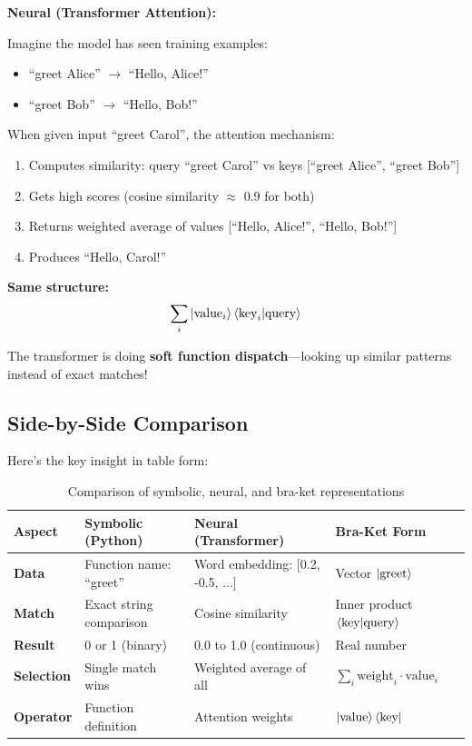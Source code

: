 \documentclass[11pt,a4paper]{article}
\theoremstyle{definition}
\begin{document}
\textbf{Neural (Transformer Attention):}

Imagine the model has seen training examples:
\begin{itemize}
\item ``greet Alice'' $\to$ ``Hello, Alice!''
\item ``greet Bob'' $\to$ ``Hello, Bob!''
\end{itemize}

When given input ``greet Carol'', the attention mechanism:
\begin{enumerate}
\item Computes similarity: query ``greet Carol'' vs keys [``greet Alice'', ``greet Bob'']
\item Gets high scores (cosine similarity $\approx$ 0.9 for both)
\item Returns weighted average of values [``Hello, Alice!'', ``Hello, Bob!'']
\item Produces ``Hello, Carol!''
\end{enumerate}

\textbf{Same structure:} 
\begin{equation}
\sum_i \ket{\text{value}_i} \braket{\text{key}_i|\text{query}}
\end{equation}

The transformer is doing \textbf{soft function dispatch}---looking up similar patterns instead of exact matches!

\subsection{Side-by-Side Comparison}

Here's the key insight in table form:

\begin{table}[h]
\centering
\begin{tabular}{llll}
\toprule
\textbf{Aspect} & \textbf{Symbolic (Python)} & \textbf{Neural (Transformer)} & \textbf{Bra-Ket Form} \\
\midrule
\textbf{Data} & Function name: ``greet'' & Word embedding: [0.2, -0.5, ...] & Vector $\ket{\text{greet}}$ \\
\textbf{Match} & Exact string comparison & Cosine similarity & Inner product $\braket{\text{key}|\text{query}}$ \\
\textbf{Result} & 0 or 1 (binary) & 0.0 to 1.0 (continuous) & Real number \\
\textbf{Selection} & Single match wins & Weighted average of all & $\sum_i \text{weight}_i \cdot \text{value}_i$ \\
\textbf{Operator} & Function definition & Attention weights & $\ket{\text{value}}\bra{\text{key}}$ \\
\bottomrule
\end{tabular}
\caption{Comparison of symbolic, neural, and bra-ket representations}
\end{table}
\end{document}
